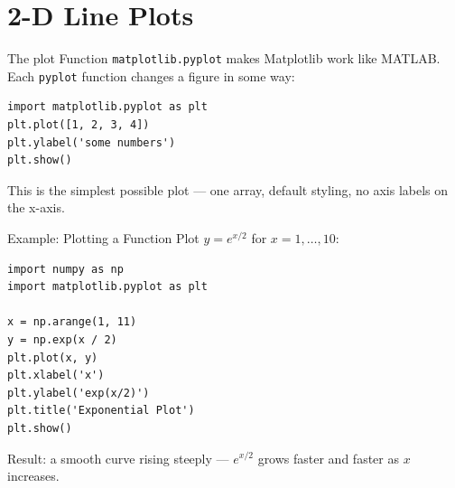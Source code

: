 \documentclass[9pt,aspectratio=169,xcolor=table]{beamer}
\begin{document}
\section{2-D Line Plots}

\begin{frame}[fragile]{The plot Function}
    \leavevmode
    \texttt{matplotlib.pyplot} makes Matplotlib work like MATLAB. Each
    \texttt{pyplot} function changes a figure in some way:

\begin{lstlisting}
import matplotlib.pyplot as plt
plt.plot([1, 2, 3, 4])
plt.ylabel('some numbers')
plt.show()
\end{lstlisting}

    \vspace{2mm}
    {\small This is the simplest possible plot --- one array, default
    styling, no axis labels on the x-axis.}
\end{frame}

\begin{frame}[fragile]{Example: Plotting a Function}
    \leavevmode
    Plot $y = e^{x/2}$ for $x = 1, \ldots, 10$:

\begin{lstlisting}
import numpy as np
import matplotlib.pyplot as plt

x = np.arange(1, 11)
y = np.exp(x / 2)
plt.plot(x, y)
plt.xlabel('x')
plt.ylabel('exp(x/2)')
plt.title('Exponential Plot')
plt.show()
\end{lstlisting}

    \vspace{1mm}
    {\small Result: a smooth curve rising steeply --- $e^{x/2}$ grows
    faster and faster as $x$ increases.}
\end{frame}
\end{document}
